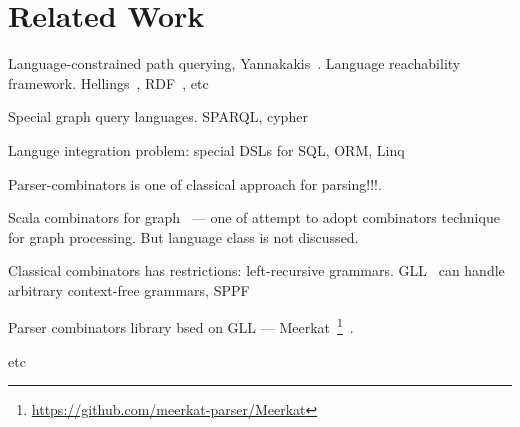 \section{Related Work}

Language-constrained path querying, Yannakakis~\cite{Yannakakis}. 
Language reachability framework.
Hellings~\cite{ConjCFPathQuery, Hellings16}, RDF~\cite{CFGonRDF}, etc~\cite{QueryGraphWithData, RegularDBQuery, GraphQueryWithEarley, FLCpathProblem, graphDB}

Special graph query languages. SPARQL, cypher

Languge integration problem: special DSLs for SQL, ORM, Linq

Parser-combinators is one of classical approach for parsing!!!.

Scala combinators for graph~\cite{ScalaGraphParsing} --- one of attempt to adopt combinators 
technique for graph processing.
But language class is not discussed.

Classical combinators has restrictions: left-recursive grammars.
GLL~\cite{scott2010gll} can handle arbitrary context-free grammars, SPPF~\cite{SPPF}

Parser combinators library bsed on GLL --- 
Meerkat~\footnote{\url{https://github.com/meerkat-parser/Meerkat}}~\cite{Meerkat}.

etc

